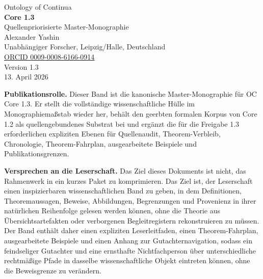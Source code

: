 \begin{titlepage}
\thispagestyle{empty}
\begin{center}
{\Large Ontology of Continua}\\[0.6cm]
{\huge \textbf{Core 1.3}}\\[0.3cm]
{\Large Quellenpriorisierte Master-Monographie}\\[1.2cm]

{\Large Alexander Yashin}\\[0.2cm]
{\normalsize Unabhängiger Forscher, Leipzig/Halle, Deutschland}\\[0.2cm]
{\normalsize \href{https://orcid.org/0009-0008-6166-0914}{ORCID 0009-0008-6166-0914}}\\[1.0cm]

{\normalsize Version 1.3}\\[0.2cm]
{\normalsize 13. April 2026}\\[1.2cm]

\begin{minipage}{0.88\textwidth}
\small
\textbf{Publikationsrolle.} Dieser Band ist die kanonische Master-Monographie für OC Core 1.3.
Er stellt die vollständige wissenschaftliche Hülle im Monographiemaßstab wieder her, behält den geerbten formalen Korpus von
Core 1.2 als quellengebundenes Substrat bei und ergänzt die für die
Freigabe 1.3 erforderlichen expliziten Ebenen für Quellenaudit, Theorem-Verbleib,
Chronologie, Theorem-Fahrplan, ausgearbeitete Beispiele und Publikationsgrenzen.

\medskip

\textbf{Versprechen an die Leserschaft.} Das Ziel dieses Dokuments ist nicht, das Rahmenwerk in ein
kurzes Paket zu komprimieren. Das Ziel ist, der Leserschaft einen inspizierbaren wissenschaftlichen Band zu geben, in dem
Definitionen, Theoremaussagen, Beweise, Abbildungen, Begrenzungen und Provenienz in
ihrer natürlichen Reihenfolge gelesen werden können, ohne die Theorie aus Übersichtsartefakten
oder verborgenen Begleitregistern rekonstruieren zu müssen. Der Band enthält daher einen
expliziten Leserleitfaden, einen Theorem-Fahrplan, ausgearbeitete Beispiele und einen Anhang zur
Gutachternavigation, sodass ein feindseliger Gutachter und eine ernsthafte Nichtfachperson
über unterschiedliche rechtmäßige Pfade in dasselbe wissenschaftliche Objekt eintreten können,
ohne die Beweisgrenze zu verändern.
\end{minipage}


\end{center}
\end{titlepage}
